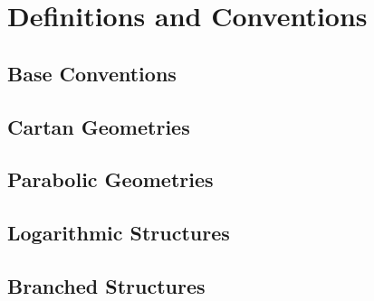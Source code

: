 \section{Definitions and Conventions}

\subsection{Base Conventions}

\subsection{Cartan Geometries}

\subsection{Parabolic Geometries}

\subsection{Logarithmic Structures}

\subsection{Branched Structures}
